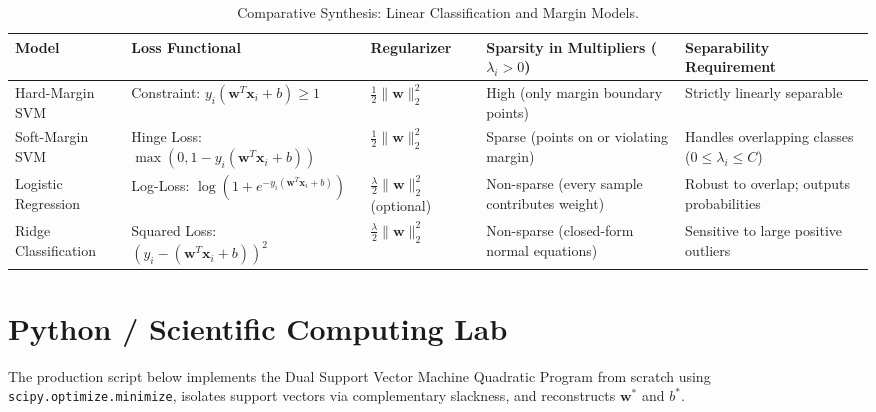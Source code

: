 \begin{table}[htbp]
\centering
\small
\begin{tabularx}{\textwidth}{lXXXX}
\toprule
\textbf{Model} & \textbf{Loss Functional} & \textbf{Regularizer} & \textbf{Sparsity in Multipliers ($\lambda_i > 0$)} & \textbf{Separability Requirement} \\
\midrule
Hard-Margin SVM & Constraint: $y_i(\mathbf{w}^T \mathbf{x}_i + b) \ge 1$ & $\frac{1}{2}\|\mathbf{w}\|_2^2$ & High (only margin boundary points) & Strictly linearly separable \\
\addlinespace
Soft-Margin SVM & Hinge Loss: $\max(0, 1 - y_i(\mathbf{w}^T\mathbf{x}_i+b))$ & $\frac{1}{2}\|\mathbf{w}\|_2^2$ & Sparse (points on or violating margin) & Handles overlapping classes ($0 \le \lambda_i \le C$) \\
\addlinespace
Logistic Regression & Log-Loss: $\log(1 + e^{-y_i(\mathbf{w}^T\mathbf{x}_i+b)})$ & $\frac{\lambda}{2}\|\mathbf{w}\|_2^2$ (optional) & Non-sparse (every sample contributes weight) & Robust to overlap; outputs probabilities \\
\addlinespace
Ridge Classification & Squared Loss: $(y_i - (\mathbf{w}^T\mathbf{x}_i+b))^2$ & $\frac{\lambda}{2}\|\mathbf{w}\|_2^2$ & Non-sparse (closed-form normal equations) & Sensitive to large positive outliers \\
\bottomrule
\end{tabularx}
\caption{Comparative Synthesis: Linear Classification and Margin Models.}
\label{tab:svm_models}
\end{table}

\section{Python / Scientific Computing Lab}

The production script below implements the Dual Support Vector Machine Quadratic Program from scratch using \texttt{scipy.optimize.minimize}, isolates support vectors via complementary slackness, and reconstructs $\mathbf{w}^*$ and $b^*$.

